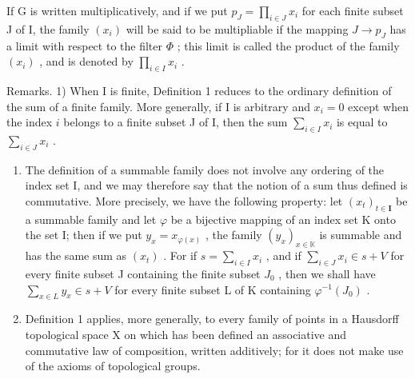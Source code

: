 If G is written multiplicatively, and if we put \(p_{J} = \prod_{i \in J} x_i\) for each finite subset J of I, the family \((x_i)\) will be said to be multipliable if the mapping \(J \to p_J\) has a limit with respect to the filter \(\Phi\) ; this limit is called the product of the family \((x_i)\) , and is denoted by \(\prod_{i \in I} x_i\) .

Remarks. 1) When I is finite, Definition 1 reduces to the ordinary definition of the sum of a finite family. More generally, if I is arbitrary and \(x_{i} = 0\) except when the index \(i\) belongs to a finite subset J of I, then the sum \(\sum_{i \in I} x_{i}\) is equal to \(\sum_{i \in J} x_{i}\) .

\begin{enumerate}
\def\labelenumi{\arabic{enumi})}
\setcounter{enumi}{1}
\item
  The definition of a summable family does not involve any ordering of the index set I, and we may therefore say that the notion of a sum thus defined is commutative. More precisely, we have the following property: let \((x_{t})_{t\in \mathbf{I}}\) be a summable family and let \(\varphi\) be a bijective mapping of an index set K onto the set I; then if we put \(y_{x} = x_{\varphi (x)}\) , the family \((y_{x})_{x\in \mathbb{K}}\) is summable and has the same sum as \((x_{t})\) . For if \(s = \sum_{i\in I}x_i\) , and if \(\sum_{i\in J}x_i\in s + V\) for every finite subset J containing the finite subset \(J_0\) , then we shall have \(\sum_{x\in L}y_x\in s + V\) for every finite subset L of K containing \(\varphi^{-1}(J_0)\) .
\item
  Definition 1 applies, more generally, to every family of points in a Hausdorff topological space X on which has been defined an associative and commutative law of composition, written additively; for it does not make use of the axioms of topological groups.
\end{enumerate}

